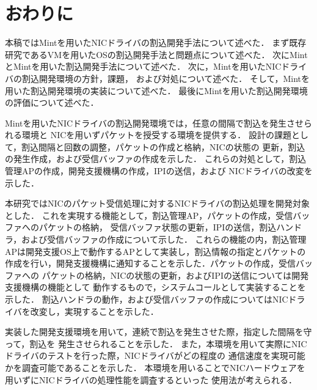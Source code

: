 \documentclass[submit,techreq,noauthor,dvipdfmx]{ipsj}
\begin{document}
\section{おわりに}\label{chap:conclusion}

本稿ではMintを用いたNICドライバの割込開発手法について述べた．
まず既存研究であるVMを用いたOSの割込開発手法と問題点について述べた．
次にMintとMintを用いた割込開発手法について述べた．
次に，Mintを用いたNICドライバの割込開発環境の方針，課題，
および対処について述べた．
そして，Mintを用いた割込開発環境の実装について述べた．
最後にMintを用いた割込開発環境の評価について述べた．

Mintを用いたNICドライバの割込開発環境では，任意の間隔で割込を発生させられる環境と
NICを用いずパケットを授受する環境を提供する．
設計の課題として，割込間隔と回数の調整，パケットの作成と格納，NICの状態の
更新，割込の発生作成，および受信バッファの作成を示した．
これらの対処として，割込管理APの作成，開発支援機構の作成，IPIの送信，および
NICドライバの改変を示した．

本研究ではNICのパケット受信処理に対するNICドライバの割込処理を開発対象とした．
これを実現する機能として，割込管理AP，パケットの作成，受信バッファへのパケットの格納，
受信バッファ状態の更新，IPIの送信，割込ハンドラ，および受信バッファの作成について示した．
これらの機能の内，割込管理APは開発支援OS上で動作するAPとして実装し，割込情報の指定とパケットの
作成を行い，開発支援機構に通知することを示した．パケットの作成，受信バッファへの
パケットの格納，NICの状態の更新，およびIPIの送信については開発支援機構の機能として
動作するもので，システムコールとして実装することを示した．
割込ハンドラの動作，および受信バッファの作成についてはNICドライバを改変し，実現することを示した．

実装した開発支援環境を用いて，連続で割込を発生させた際，指定した間隔を守って，割込を
発生させられることを示した．
また，本環境を用いて実際にNICドライバのテストを行った際，NICドライバがどの程度の
通信速度を実現可能かを調査可能であることを示した．
本環境を用いることでNICハードウェアを用いずにNICドライバの処理性能を調査するといった
使用法が考えられる．


\end{document}
